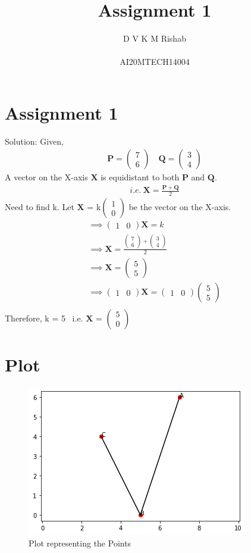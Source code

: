 \documentclass{article}
\title{Assignment 1}
\author{D V K M Rishab \\ \\ AI20MTECH14004}
\date{}
\newcommand{\myvec}[1]{\ensuremath{\begin{pmatrix}#1\end{pmatrix}}}
\begin{document}
\let\vec\mathbf
\maketitle
\section*{Assignment 1}
Solution: 
Given,
\begin{align}
\vec{P} = \myvec{7\\6} \quad
\vec{Q} = \myvec{3\\4}    
\end{align}
A vector on  the  X-axis  $\vec{X}$  is  equidistant  to  both  $\vec{P}$  and $\vec{Q}$.
\begin{align}
i.e. \ \vec{X} = \frac{{\vec{P}+\vec{Q}}}{2}    
\end{align}
Need to find  k. 
Let $\vec{X}$ = k\myvec{1\\0}  be  the  vector  on  the  X-axis.
\begin{align}
\implies \myvec{1 & 0}\vec{X} = k \\
\implies \vec{X} = \frac{\myvec{7\\6}+\myvec{3\\4}}{2} \\
\implies \vec{X} = \myvec{5\\5} \\
\implies \myvec{1 & 0}\vec{X} = \myvec{1 & 0}\myvec{5\\5} \\ 
\end{align}
Therefore, k = 5 \ i.e. $\vec{X}$ = \myvec{5\\0}
\newpage
\section*{Plot}
\begin{figure}[!htb]
    \centering
    \includegraphics[width=\columnwidth]{Assignment1.png}
    \caption{Plot representing the Points}
    \label{Fig.1}
\end{figure}
\end{document}
